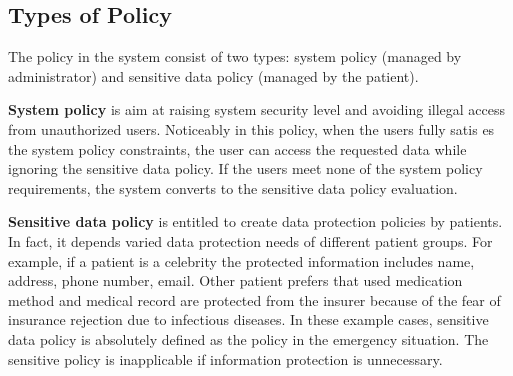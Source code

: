 \documentclass[conference]{IEEEtran}
\begin{document}
\subsection{Types of Policy}\label{App:Type}
The policy in the system consist of two types: system policy (managed by administrator) and sensitive data policy (managed by the patient).

\textbf{System policy}
is aim at raising system security level and avoiding illegal access from unauthorized users.
Noticeably in this policy, when the users fully satis es the system policy constraints, the user can access the requested data while ignoring the sensitive data policy.
If the users meet none of the system policy requirements, the system converts to the sensitive data policy evaluation.

\textbf{Sensitive data policy}
 is entitled to create data protection policies by patients.
In fact, it depends varied data protection needs of different patient groups. 
For example, if a patient is a celebrity the protected information includes name, address, phone number, email. 
Other patient prefers that used medication method and medical record are protected from the insurer because of the fear of insurance rejection due to infectious diseases.
In these example cases, sensitive data policy is absolutely defined as the policy in the emergency situation. 
The sensitive policy is inapplicable if information protection is unnecessary.

\end{document}
